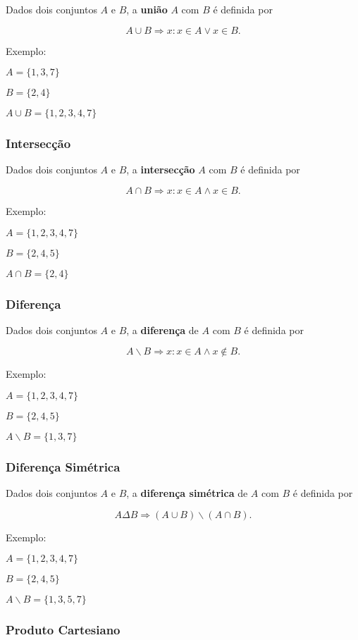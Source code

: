 Dados dois conjuntos \(A\) e \(B\), a \textbf{união} \(A\) com \(B\) é
definida por

\[A\cup B \Rightarrow x : x \in A \vee x \in B.\]

Exemplo:

\(A=\{1,3,7\}\)

\(B=\{2,4\}\)

\(A\cup B = \{1,2,3,4,7\}\)

\subsubsection{Intersecção}

Dados dois conjuntos \(A\) e \(B\), a \textbf{intersecção} \(A\) com
\(B\) é definida por

\[A\cap B \Rightarrow x : x \in A \land x \in B.\]

Exemplo:

\(A=\{1,2,3,4,7\}\)

\(B=\{2,4,5\}\)

\(A\cap B = \{2,4\}\)

\subsubsection{Diferença}

Dados dois conjuntos \(A\) e \(B\), a \textbf{diferença} de \(A\) com
\(B\) é definida por

\[A\backslash B \Rightarrow x : x \in A \land x \notin B.\]

Exemplo:

\(A=\{1,2,3,4,7\}\)

\(B=\{2,4,5\}\)

\(A\backslash B = \{1,3,7\}\)

\subsubsection{Diferença Simétrica}

Dados dois conjuntos \(A\) e \(B\), a \textbf{diferença simétrica} de
\(A\) com \(B\) é definida por

\[A\Delta B \Rightarrow (A \cup B) \backslash (A \cap B).\]

Exemplo:

\(A=\{1,2,3,4,7\}\)

\(B=\{2,4,5\}\)

\(A\backslash B = \{1,3,5,7\}\)

\subsubsection{Produto Cartesiano}

